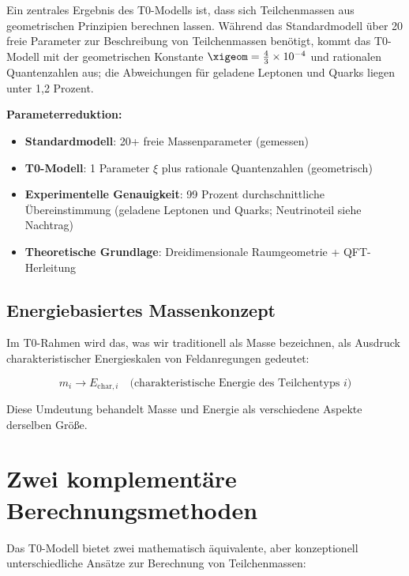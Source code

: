 Ein zentrales Ergebnis des T0-Modells ist, dass sich Teilchenmassen aus geometrischen Prinzipien berechnen lassen. Während das Standardmodell über 20 freie Parameter zur Beschreibung von Teilchenmassen benötigt, kommt das T0-Modell mit der geometrischen Konstante $\xigeom = \frac{4}{3} \times 10^{-4}$ und rationalen Quantenzahlen aus; die Abweichungen für geladene Leptonen und Quarks liegen unter 1,2 Prozent.

\begin{tcolorbox}[colback=green!5!white,colframe=green!75!black,title=Parameterreduktion bei den Massen]
	\textbf{Parameterreduktion:}
	\begin{itemize}
		\item \textbf{Standardmodell}: 20+ freie Massenparameter (gemessen)
		\item \textbf{T0-Modell}: 1 Parameter $\xi$ plus rationale Quantenzahlen (geometrisch)
		\item \textbf{Experimentelle Genauigkeit}: 99 Prozent durchschnittliche Übereinstimmung (geladene Leptonen und Quarks; Neutrinoteil siehe Nachtrag)
		\item \textbf{Theoretische Grundlage}: Dreidimensionale Raumgeometrie + QFT-Herleitung
	\end{itemize}
\end{tcolorbox}

\subsection{Energiebasiertes Massenkonzept}
\label{subsec:energy_based_mass}

Im T0-Rahmen wird das, was wir traditionell als Masse bezeichnen, als Ausdruck charakteristischer Energieskalen von Feldanregungen gedeutet:

\begin{equation}
	\boxed{m_i \rightarrow E_{\text{char},i} \quad \text{(charakteristische Energie des Teilchentyps } i\text{)}}
	\label{eq:mass_to_energy}
\end{equation}

Diese Umdeutung behandelt Masse und Energie als verschiedene Aspekte derselben Größe.

\section{Zwei komplementäre Berechnungsmethoden}
\label{sec:two_calculation_methods}

Das T0-Modell bietet zwei mathematisch äquivalente, aber konzeptionell unterschiedliche Ansätze zur Berechnung von Teilchenmassen:

